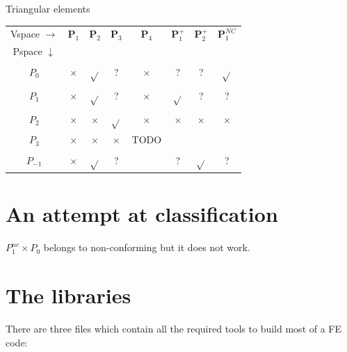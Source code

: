 \begin{center}
Triangular elements\\
\begin{tabular}{cccccccc}
\hline
Vspace $\rightarrow$& ${\bm P}_1$ & ${\bm P}_2$ & ${\bm P}_3$ & ${\bm P}_4$ & ${\bm P}_1^+$ & ${\bm P}_2^+$ & ${\bm P}_1^{NC}$  \\
Pspace $\downarrow$ & \\
$P_0$    & $\times$ & $\sqrt{}$ & ?         & $\times$ &  ?        &  ?        & $\sqrt{}$   \\
$P_1$    & $\times$ & $\sqrt{}$ & ?         & $\times$ & $\sqrt{}$ &  ?        & ?           \\
$P_2$    & $\times$ & $\times$  & $\sqrt{}$ & $\times$ & $\times$  & $\times$  & $\times$    \\
$P_3$    & $\times$ & $\times$  & $\times$  & TODO     &           &           &             \\ 
$P_{-1}$ & $\times$ & $\sqrt{}$ & ?         &          &  ?        & $\sqrt{}$ & ?           \\
\hline
\end{tabular}
\end{center}


\newpage
\section*{An attempt at classification}



$P_1^{nc} \times P_0$ belongs to non-conforming but it does not work.

\newpage
\section*{The libraries}

There are three files which contain all the required tools to build most of a FE code:

